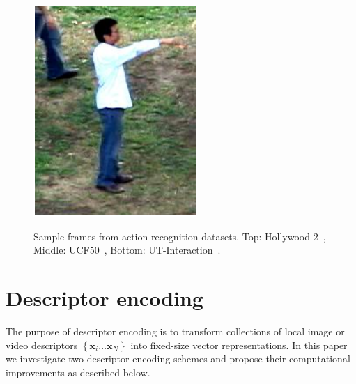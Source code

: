 \documentclass[10pt,twocolumn,letterpaper]{article}
\begin{document}
\begin{figure}[!t]
\begin{center}
\includegraphics[scale=0.4]{figures/dataset_thumb/uti/crop_class6.pdf} \\
\smallskip
\caption{Sample frames from action recognition datasets. Top: Hollywood-2~\cite{Marszalek09}, Middle: UCF50~\cite{Reddy12}, Bottom: UT-Interaction~\cite{Ryoo10}.\vspace{-.5cm}}
\label{fig:datasets}
\end{center}
\end{figure}




\section{Descriptor encoding}
\label{sec:quantization}
The purpose of descriptor encoding is to transform collections of local image or video descriptors $\left\{\textbf{x}_i\dots\textbf{x}_N\right\}$ into fixed-size vector representations.
In this paper we investigate two descriptor encoding schemes and propose their computational improvements as described below.
\end{document}
